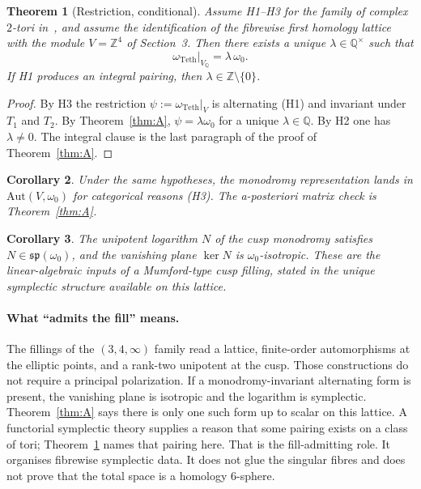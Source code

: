 \documentclass[11pt,a4paper]{article}
\newtheorem{theorem}{Theorem}
\newtheorem{corollary}[theorem]{Corollary}
\theoremstyle{definition}
\theoremstyle{remark}
\newcommand{\Q}{\mathbb{Q}}
\newcommand{\Z}{\mathbb{Z}}
\newcommand{\Aut}{\mathrm{Aut}}
\newcommand{\spq}{\mathfrak{sp}}
\newcommand{\teth}{\omega_{\mathrm{Teth}}}
\begin{document}
\begin{theorem}[Restriction, conditional]\label{thm:C}
Assume H1--H3 for the family of complex $2$-tori in~\cite{AlpogeS6}, and assume the identification of the fibrewise first homology lattice with the module $V=\Z^4$ of Section~3. Then there exists a unique $\lambda\in\Q^\times$ such that
\[
\teth\big|_{V_{\Q}}=\lambda\,\omega_0.
\]
If H1 produces an integral pairing, then $\lambda\in\Z\setminus\{0\}$.
\end{theorem}

\begin{proof}
By H3 the restriction $\psi:=\teth|_V$ is alternating (H1) and invariant under $T_1$ and $T_2$. By Theorem~\ref{thm:A}, $\psi=\lambda\omega_0$ for a unique $\lambda\in\Q$. By H2 one has $\lambda\neq 0$. The integral clause is the last paragraph of the proof of Theorem~\ref{thm:A}.
\end{proof}

\begin{corollary}
Under the same hypotheses, the monodromy representation lands in $\Aut(V,\omega_0)$ for categorical reasons (H3). The a-posteriori matrix check is Theorem~\ref{thm:A}.
\end{corollary}

\begin{corollary}
The unipotent logarithm $N$ of the cusp monodromy satisfies $N\in\spq(\omega_0)$, and the vanishing plane $\ker N$ is $\omega_0$-isotropic. These are the linear-algebraic inputs of a Mumford-type cusp filling, stated in the unique symplectic structure available on this lattice.
\end{corollary}

\paragraph{What ``admits the fill'' means.}
The fillings of the $(3,4,\infty)$ family read a lattice, finite-order automorphisms at the elliptic points, and a rank-two unipotent at the cusp. Those constructions do not require a principal polarization. If a monodromy-invariant alternating form is present, the vanishing plane is isotropic and the logarithm is symplectic. Theorem~\ref{thm:A} says there is only one such form up to scalar on this lattice. A functorial symplectic theory supplies a reason that some pairing exists on a class of tori; Theorem~\ref{thm:C} names that pairing here. That is the fill-admitting role. It organises fibrewise symplectic data. It does not glue the singular fibres and does not prove that the total space is a homology $6$-sphere.
\end{document}
